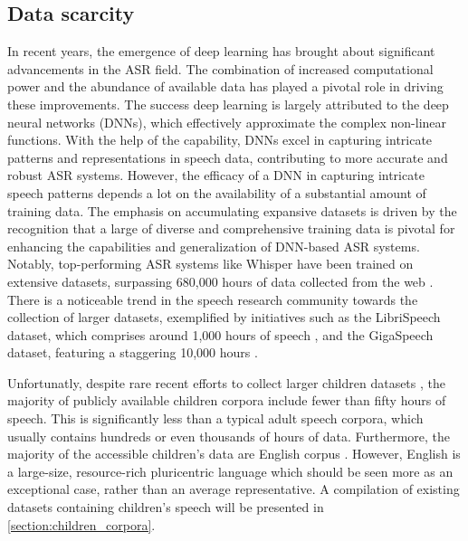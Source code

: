 \subsection{Data scarcity}%
\label{section:data_scarcity}
In recent years, the emergence of deep learning has brought about significant advancements in the ASR field. The combination of increased computational power and the abundance of available data has played a pivotal role in driving these improvements. The success deep learning is largely attributed to the deep neural networks (DNNs), which effectively approximate the complex non-linear functions. With the help of the capability, DNNs excel in capturing intricate patterns and representations in speech data, contributing to more accurate and robust ASR systems. However, the efficacy of a DNN in capturing intricate speech patterns depends a lot on the availability of a substantial amount of training data. The emphasis on accumulating expansive datasets is driven by the recognition that a large of diverse and comprehensive training data is pivotal for enhancing the capabilities and generalization of DNN-based ASR systems. Notably, top-performing ASR systems like Whisper have been trained on extensive datasets, surpassing 680,000 hours of data collected from the web \cite{radford2023robust}. There is a noticeable trend in the speech research community towards the collection of larger datasets, exemplified by initiatives such as the LibriSpeech dataset, which comprises around 1,000 hours of speech \cite{librispeech}, and the GigaSpeech dataset, featuring a staggering 10,000 hours \cite{chen2021gigaspeech}.

Unfortunatly, despite rare recent efforts to collect larger children datasets \cite{MyST,singakids,ahmed2021auskidtalk}, the majority of publicly available children corpora include fewer than fifty hours of speech. This is significantly less than a typical adult speech corpora, which usually contains hundreds or even thousands of hours of data. Furthermore, the majority of the accessible children's data are English corpus \cite{MyST,cmu,cslu,pf-star-british,ahmed2021auskidtalk}. However, English is a large-size, resource-rich pluricentric language which should be seen more as an exceptional case, rather than an average representative. A compilation of existing datasets containing children's speech will be presented in \ref{section:children_corpora}.

